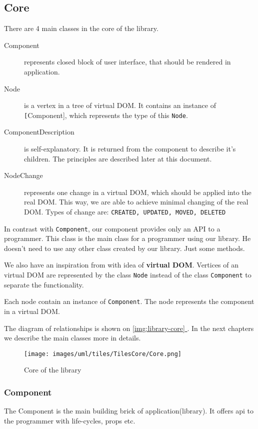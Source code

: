 \documentclass[oneside, 12pt]{book}
\newcommand*{\fullref}[1]{\hyperref[{#1}]{\autoref*{#1} \nameref*{#1}}}
\begin{document}
  \subsection{Core}\label{subsec:our-architecture-core}
    There are 4 main classes in the core of the library.
    \begin{description}
      \item[Component] 
        represents closed block of user interface, 
        that should be rendered in application.
      \item[Node]
        is a vertex in a tree of virtual DOM. 
        It contains an instance of \texttt[Component], which represents the type of this \texttt{Node}.
      \item[ComponentDescription]
        is self-explanatory. 
        It is returned from the component to describe it's children. 
        The principles are described later at this document.
      \item[NodeChange]
        represents one change in a virtual DOM, which should be applied into the real DOM. 
        This way, we are able to achieve minimal changing of the real DOM. 
        Types of change are: \texttt{CREATED, UPDATED, MOVED, DELETED}
    \end{description}

    In contrast with \facebook \react \texttt{Component}, our component provides only an API to a programmer.
    This class is the main class for a programmer using our library. 
    He doesn't need to use any other class created by our library. 
    Just some methods.

    We also have an inspiration from \react with idea of \textbf{virtual DOM}. 
    Vertices of an virtual DOM are represented by the class \texttt{Node} instead of the class \texttt{Component} to separate the functionality. 

    Each node contain an instance of \texttt{Component}. 
    The node represents the component in a virtual DOM.
    
    The diagram of relationships is shown on \fullref{img:library-core}. 
    In the next chapters we describe the main classes more in details.
    \begin{figure}[h]
    \centering  
      \texttt{[image: images/uml/tiles/TilesCore/Core.png]}
      \caption{Core of the library}
      \label{img:library-core}
    \end{figure}

    \subsubsection{Component}\label{subsubsec:our-architecture-core-component}
      The Component is the main building brick of application(library). 
      It offers api to the programmer with life-cycles, props etc. 
\end{document}
